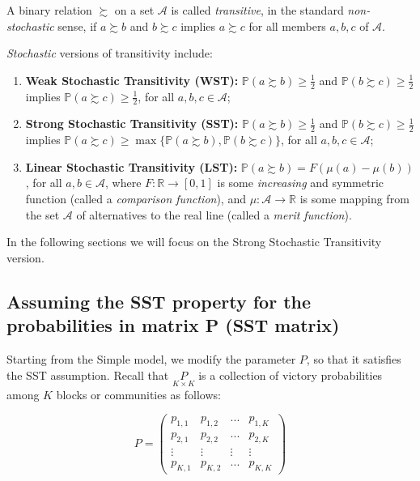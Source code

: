 \documentclass[11pt]{amsart}
\begin{document}
A binary relation $\succsim$ on a set $\mathcal{A}$ is called \emph{transitive}, in the standard \textit{non-stochastic} sense, if
$a \succsim b$ and $b \succsim c$ implies $a \succsim c$ for all members $a,b,c$ of $\mathcal{A}$.

\emph{Stochastic} versions of transitivity include:
\begin{enumerate}
  \item \textbf{Weak Stochastic Transitivity (WST):} $\mathbb{P}(a\succsim b)\geq \tfrac{1}{2}$ and $\mathbb{P}(b\succsim c)\geq \tfrac{1}{2}$ implies $\mathbb{P}(a\succsim c)\geq \tfrac{1}{2}$, for all $a,b,c \in \mathcal{A}$;
  \item \textbf{Strong Stochastic Transitivity (SST):} $\mathbb{P}(a\succsim b)\geq \tfrac{1}{2}$ and $\mathbb{P}(b\succsim c)\geq \tfrac{1}{2}$ implies $\mathbb{P}(a\succsim c)\geq \max \{\mathbb{P}(a\succsim b),\mathbb{P}(b\succsim c)\}$, for all $a,b,c \in \mathcal{A}$;
  \item \textbf{Linear Stochastic Transitivity (LST):} $\mathbb{P}(a\succsim b) = F(\mu(a) - \mu(b))$, for all $a,b \in \mathcal{A}$, where $F:\mathbb{R} \to [0,1]$ is some \textit{increasing} and symmetric function (called a \emph{comparison function}), and $\mu: \mathcal{A}\to \mathbb{R}$ is some mapping from the set $\mathcal{A}$ of alternatives to the real line (called a \emph{merit function}).
\end{enumerate}

In the following sections we will focus on the Strong Stochastic Transitivity version.

\subsection{Assuming the SST property for the probabilities in matrix P (SST matrix)}
Starting from the Simple model, we modify the parameter $P$, so that it satisfies the SST assumption. Recall that $\underset{K \times K}{P}$ is a collection of victory probabilities among $K$ blocks or communities as follows:

\begin{center}
$$P = 
\left(\begin{array}{cccc}p_{1,1} & p_{1,2} &  ... & p_{1,K} \\ p_{2,1} & p_{2,2} & ... & p_{2,K} \\ \vdots & \vdots & \vdots & \vdots \\ p_{K,1}& p_{K,2 }& ... & p_{K,K}\end{array}\right)$$
\end{center}
\end{document}
